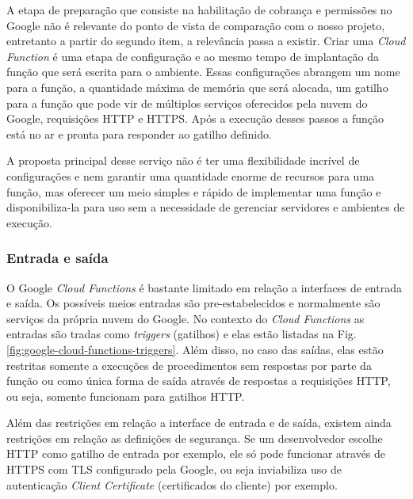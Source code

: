 A etapa de preparação que consiste na habilitação de cobrança e permissões no Google não é relevante do ponto de vista de comparação com o nosso projeto, entretanto a partir do segundo item, a relevância passa a existir.
Criar uma \textit{Cloud Function} é uma etapa de configuração e ao mesmo tempo de implantação da função que será escrita para o ambiente. Essas configurações abrangem um nome para a função, a quantidade máxima de memória que será alocada, um gatilho para a função que pode vir de múltiplos serviços oferecidos pela nuvem do Google, requisições HTTP e HTTPS. Após a execução desses passos a função está no ar e pronta para responder ao gatilho definido.

\bigskip
A proposta principal desse serviço não é ter uma flexibilidade incrível de configurações e nem garantir uma quantidade enorme de recursos para uma função, mas oferecer um meio simples e rápido de implementar uma função e disponibiliza-la para uso sem a necessidade de gerenciar servidores e ambientes de execução.

\subsubsection{Entrada e saída}

O Google \textit{Cloud Functions} é bastante limitado em relação a interfaces de entrada e saída. Os possíveis meios entradas são pre-estabelecidos e normalmente são serviços da própria nuvem do Google. No contexto do \textit{Cloud Functions} as entradas são tradas como \textit{triggers} (gatilhos) e elas estão listadas na Fig. \ref{fig:google-cloud-functions-triggers}. Além disso, no caso das saídas, elas estão restritas somente a execuções de procedimentos sem respostas por parte da função ou como única forma de saída através de respostas a requisições HTTP, ou seja, somente funcionam para gatilhos HTTP.

\bigskip
Além das restrições em relação a interface de entrada e de saída, existem ainda restrições em relação as definições de segurança. Se um desenvolvedor escolhe HTTP como gatilho de entrada por exemplo, ele só pode funcionar através de HTTPS com TLS configurado pela Google, ou seja inviabiliza uso de autenticação \textit{Client Certificate} (certificados do cliente) por exemplo.

